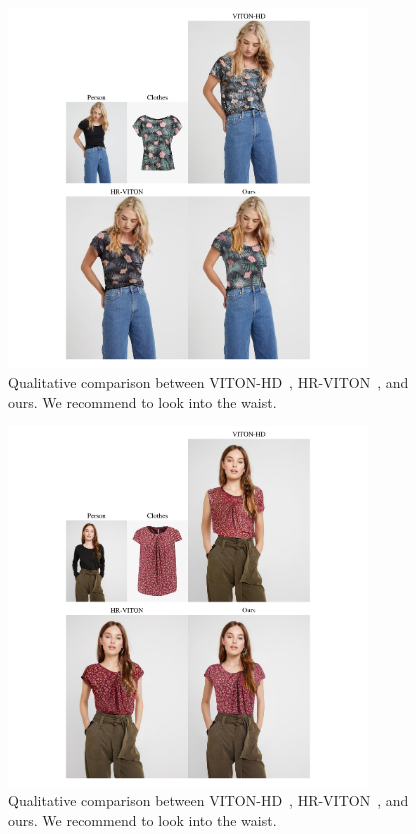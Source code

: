 \begin{figure}[t!]
    \centering
     \includegraphics[width=0.85\textwidth]{fig_supp/fig_suppl_HD_7.pdf}
     \caption{Qualitative comparison between VITON-HD~\cite{choi2021viton}, HR-VITON~\cite{lee2022hrviton}, and ours. We recommend to look into the waist.
     }
     \label{fig_supp_tucked_in_HR_7}
\end{figure}

\begin{figure}[t!]
    \centering
     \includegraphics[width=0.85\textwidth]{fig_supp/fig_suppl_HD_8.pdf}
     \caption{Qualitative comparison between VITON-HD~\cite{choi2021viton}, HR-VITON~\cite{lee2022hrviton}, and ours. We recommend to look into the waist.
     }
     \label{fig_supp_tucked_in_HR_8}
\end{figure}

